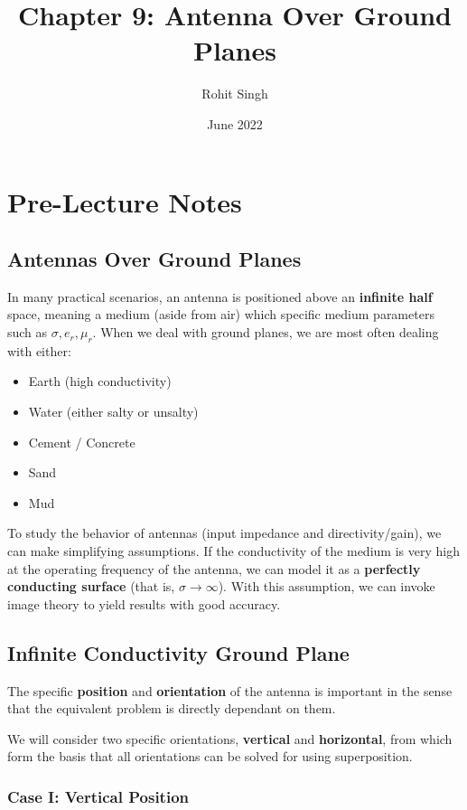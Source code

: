 \documentclass{article}
\title{Chapter 9: Antenna Over Ground Planes}
\author{Rohit Singh}
\date{June 2022}
\begin{document}
\maketitle

\section{Pre-Lecture Notes}

\subsection{Antennas Over Ground Planes}

In many practical scenarios, an antenna is positioned above an \textbf{infinite half} space, meaning a medium (aside from air) which specific medium parameters such as $\sigma, e_r, \mu_r$. When we deal with ground planes, we are most often dealing with either:
\begin{itemize}
    \item Earth (high conductivity)
    \item Water (either salty or unsalty)
    \item Cement / Concrete
    \item Sand
    \item Mud
\end{itemize}

To study the behavior of antennas (input impedance and directivity/gain), we can make simplifying assumptions. If the conductivity of the medium is very high at the operating frequency of the antenna, we can model it as a \textbf{perfectly conducting surface} (that is, $\sigma \to \infty$). With this assumption, we can invoke image theory to yield results with good accuracy.

\subsection{Infinite Conductivity Ground Plane}

The specific \textbf{position} and \textbf{orientation} of the antenna is important in the sense that the equivalent problem is directly dependant on them.

We will consider two specific orientations, \textbf{vertical} and \textbf{horizontal}, from which form the basis that all orientations can be solved for using superposition.

\subsubsection{Case I: Vertical Position}
\end{document}
